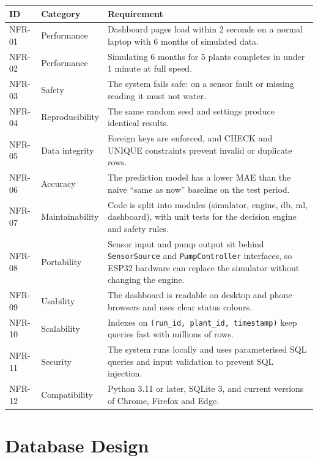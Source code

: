 \documentclass[11pt,a4paper]{article}
\newcommand{\cn}[1]{\texttt{#1}}   %
\begin{document}
\begin{xltabular}{\textwidth}{@{}l l Y@{}}
  \toprule
  \textbf{ID} & \textbf{Category} & \textbf{Requirement}\\
  \midrule
  \endhead
  NFR-01 & Performance & Dashboard pages load within 2 seconds on a normal laptop with 6 months of simulated data.\\
  NFR-02 & Performance & Simulating 6 months for 5 plants completes in under 1 minute at full speed.\\
  NFR-03 & Safety & The system fails safe: on a sensor fault or missing reading it must not water.\\
  NFR-04 & Reproducibility & The same random seed and settings produce identical results.\\
  NFR-05 & Data integrity & Foreign keys are enforced, and CHECK and UNIQUE constraints prevent invalid or duplicate rows.\\
  NFR-06 & Accuracy & The prediction model has a lower MAE than the naive ``same as now'' baseline on the test period.\\
  NFR-07 & Maintainability & Code is split into modules (simulator, engine, db, ml, dashboard), with unit tests for the decision engine and safety rules.\\
  NFR-08 & Portability & Sensor input and pump output sit behind \cn{SensorSource} and \cn{PumpController} interfaces, so ESP32 hardware can replace the simulator without changing the engine.\\
  NFR-09 & Usability & The dashboard is readable on desktop and phone browsers and uses clear status colours.\\
  NFR-10 & Scalability & Indexes on \cn{(run\_id, plant\_id, timestamp)} keep queries fast with millions of rows.\\
  NFR-11 & Security & The system runs locally and uses parameterised SQL queries and input validation to prevent SQL injection.\\
  NFR-12 & Compatibility & Python 3.11 or later, SQLite 3, and current versions of Chrome, Firefox and Edge.\\
  \bottomrule
\end{xltabular}

\section{Database Design}
\end{document}
